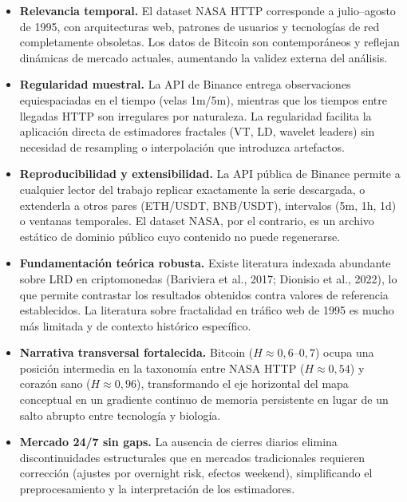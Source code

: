 
\begin{itemize}[leftmargin=2em]
    \item \textbf{Relevancia temporal.}
          El dataset NASA HTTP corresponde a julio--agosto de 1995, con
          arquitecturas web, patrones de usuarios y tecnologías de red
          completamente obsoletas. Los datos de Bitcoin son contemporáneos
          y reflejan dinámicas de mercado actuales, aumentando la validez
          externa del análisis.

    \item \textbf{Regularidad muestral.}
          La API de Binance entrega observaciones equiespaciadas en el
          tiempo (velas 1m/5m), mientras que los tiempos entre llegadas
          HTTP son irregulares por naturaleza. La regularidad facilita la
          aplicación directa de estimadores fractales (VT, LD, wavelet
          leaders) sin necesidad de resampling o interpolación que
          introduzca artefactos.

    \item \textbf{Reproducibilidad y extensibilidad.}
          La API pública de Binance permite a cualquier lector del trabajo
          replicar exactamente la serie descargada, o extenderla a otros
          pares (ETH/USDT, BNB/USDT), intervalos (5m, 1h, 1d) o ventanas
          temporales. El dataset NASA, por el contrario, es un archivo
          estático de dominio público cuyo contenido no puede regenerarse.

    \item \textbf{Fundamentación teórica robusta.}
          Existe literatura indexada abundante sobre LRD en criptomonedas
          (Bariviera et al., 2017; Dionisio et al., 2022), lo que permite
          contrastar los resultados obtenidos contra valores de referencia
          establecidos. La literatura sobre fractalidad en tráfico web de
          1995 es mucho más limitada y de contexto histórico específico.

    \item \textbf{Narrativa transversal fortalecida.}
          Bitcoin ($H\approx0{,}6$--$0{,}7$) ocupa una posición
          intermedia en la taxonomía entre NASA HTTP ($H\approx0{,}54$)
          y corazón sano ($H\approx0{,}96$), transformando el eje
          horizontal del mapa conceptual en un gradiente continuo de
          memoria persistente en lugar de un salto abrupto entre
          tecnología y biología.

    \item \textbf{Mercado 24/7 sin gaps.}
          La ausencia de cierres diarios elimina discontinuidades
          estructurales que en mercados tradicionales requieren corrección
          (ajustes por overnight risk, efectos weekend), simplificando el
          preprocesamiento y la interpretación de los estimadores.
\end{itemize}
